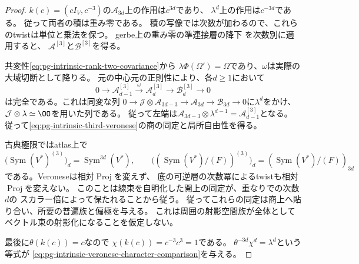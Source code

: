 \begin{proof}
$k(c)=(cI_V,c^{-3})$の$\mathcal A_{3d}$上の作用は$c^{3d}$であり、
$\lambda^d$上の作用は$c^{-3d}$である。
従って両者の積は重み零である。
積の写像では次数が加わるので、これらのtwistは単位と乗法を保つ。
gerbe上の重み零の準連接層の降下
\cite[Proposition~4.10]{PBerghSchnurerGerbes}を次数別に適用すると、
$\mathcal A^{[3]}$と$\mathcal B^{[3]}$を得る。

共変性\eqref{eq:pg-intrinsic-rank-two-covariance}から
$\lambda\Phi(\Omega')=\Omega$であり、$\omega$は実際の大域切断として降りる。
元の中心元の正則性により、各$d\ge1$において
\begin{equation}
 0\longrightarrow\mathcal A^{[3]}_{d-1}
 \xrightarrow{\ \omega\ }\mathcal A^{[3]}_d
 \longrightarrow\mathcal B^{[3]}_d\longrightarrow0
 \label{eq:pg-intrinsic-veronese-quotient-sequence}
\end{equation}
は完全である。これは同変な列
$0\to\mathcal J\otimes\mathcal A_{3d-3}\to\mathcal A_{3d}
\to\mathcal B_{3d}\to0$に$\lambda^d$をかけ、
$\mathcal J\otimes\lambda\simeq\OO$を用いた列である。
従って左端は$\mathcal A_{3d-3}\otimes\lambda^{d-1}=\mathcal A^{[3]}_{d-1}$となる。
従って\eqref{eq:pg-intrinsic-third-veronese}の商の同定と局所自由性を得る。

古典極限ではatlas上で
\begin{equation}
 \bigl(\operatorname{Sym}(V^*)^{(3)}\bigr)_d
     =\operatorname{Sym}^{3d}(V^*),\qquad
 \bigl((\operatorname{Sym}(V^*)/(F))^{(3)}\bigr)_d
     =(\operatorname{Sym}(V^*)/(F))_{3d}
 \label{eq:pg-intrinsic-veronese-classical}
\end{equation}
である。Veroneseは相対$\operatorname{Proj}$を変えず、
底の可逆層の次数冪によるtwistも相対$\operatorname{Proj}$を変えない。
このことは線束を自明化した開上の同定が、重なりでの次数$d$の
スカラー倍によって保たれることから従う。
従ってこれらの同定は商上へ貼り合い、所要の普遍族と偏極を与える。
これは周囲の射影空間族が全体としてベクトル束の射影化になることを仮定しない。

最後に$\theta(k(c))=c$なので
$\chi(k(c))=c^{-3}c^3=1$である。
$\theta^{-3d}\chi^d=\lambda^d$という等式が
\eqref{eq:pg-intrinsic-veronese-character-comparison}を与える。
\end{proof}

